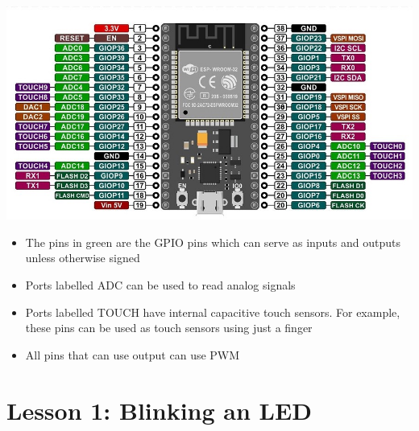 \documentclass[a4paper,12pt]{report}
\begin{document}
\newpage
\begin{center}
    \includegraphics[scale = 2]{Assets/Esp_pinout.jpg}
    \begin{itemize}
        \item The pins in green are the GPIO pins which can serve as inputs and outputs unless otherwise signed
        \item Ports labelled ADC can be used to read analog signals
        \item Ports labelled TOUCH have internal capacitive touch sensors. For example, these pins can be used as touch sensors using just a finger
        \item All pins that can use output can use PWM
    \end{itemize}
\end{center}

\newpage

\section*{Lesson 1: Blinking an LED}
\end{document}
